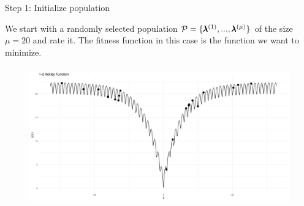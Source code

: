 \begin{frame}{Step 1: Initialize population}

    We start with a randomly selected population $\mathcal{P} = \{\pmb{\lambda}^{(1)}, ..., \pmb{\lambda}^{(\mu)}\}$ of the size $\mu = 20$ and rate it. The fitness function in this case is the function we want to minimize.


\begin{center}
\begin{figure}
\includegraphics[width=\textwidth, height=6cm]{images/ea_ex2.png}
\end{figure}
\end{center}


\end{frame}

